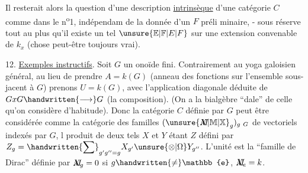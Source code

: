 Il resterait alors la question d'une description \uline{intrinsèque} d'une catégorie $C$ comme dans le n\textsuperscript{o}1, indépendam de la donnée d'un $F$ préli%
%
minaire, - sous réserve tout au plus qu'il existe un tel $\unsure{\mathbb{E}|\mathbb{F}|E|F}$ sur une extension convenable de $k_x$ (chose peut-être toujours vrai).

12. \uline{Exemples instructifs}. Soit $G$ un onoïde fini. Contrairement au yoga galoisien général, au lieu de prendre $A=k(G)$ (anneau des fonctions sur l'ensemble sous-jacent à $G$) prenons $U=k(G)$, avec l'application diagonale déduite de $GxG\handwritten{\longrightarrow}G$ (la composition). (On a la bialgèbre ``dale'' de celle qu'on considère d'habitude). Donc la catégorie $C$ définie par $G$  peut être considérée comme la catégorie des familles $(\unsure{\rlap{\(M\)}X|\mathbb M|\mathbb X}_g)_{g\ G}$ de vectoriels indexés par $G$, l produit de deux tels $X$ et $Y$ étant $Z$ défini par $Z_g=\handwritten{\displaystyle\sum}_{g'g''=g}X_{g'}\unsure{\otimes|\Omega} Y_{g''}$. L'unité est la ``famille de Dirac'' définie par $\rlap{\(M\)}X_g=0$ si $g\handwritten{\ne}\mathbb{e}$, $\rlap{\(M\)}X_e=k$.


